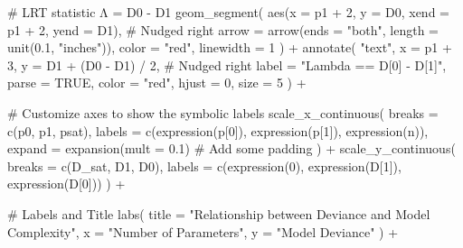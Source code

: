 \documentclass[
  letterpaper,
  DIV=11,
  numbers=noendperiod]{scrreprt}
\newenvironment{Shaded}{\begin{snugshade}}{\end{snugshade}}
\newcommand{\AttributeTok}[1]{\textcolor[rgb]{0.40,0.45,0.13}{#1}}
\newcommand{\CommentTok}[1]{\textcolor[rgb]{0.37,0.37,0.37}{#1}}
\newcommand{\ConstantTok}[1]{\textcolor[rgb]{0.56,0.35,0.01}{#1}}
\newcommand{\DecValTok}[1]{\textcolor[rgb]{0.68,0.00,0.00}{#1}}
\newcommand{\FloatTok}[1]{\textcolor[rgb]{0.68,0.00,0.00}{#1}}
\newcommand{\FunctionTok}[1]{\textcolor[rgb]{0.28,0.35,0.67}{#1}}
\newcommand{\NormalTok}[1]{\textcolor[rgb]{0.00,0.23,0.31}{#1}}
\newcommand{\SpecialCharTok}[1]{\textcolor[rgb]{0.37,0.37,0.37}{#1}}
\newcommand{\StringTok}[1]{\textcolor[rgb]{0.13,0.47,0.30}{#1}}
\begin{document}
\begin{Shaded}
\begin{Highlighting}[]
  \CommentTok{\# LRT statistic Λ = D0 {-} D1}
  \FunctionTok{geom\_segment}\NormalTok{(}
    \FunctionTok{aes}\NormalTok{(}\AttributeTok{x =}\NormalTok{ p1 }\SpecialCharTok{+} \DecValTok{2}\NormalTok{, }\AttributeTok{y =}\NormalTok{ D0, }\AttributeTok{xend =}\NormalTok{ p1 }\SpecialCharTok{+} \DecValTok{2}\NormalTok{, }\AttributeTok{yend =}\NormalTok{ D1), }\CommentTok{\# Nudged right}
    \AttributeTok{arrow =} \FunctionTok{arrow}\NormalTok{(}\AttributeTok{ends =} \StringTok{"both"}\NormalTok{, }\AttributeTok{length =} \FunctionTok{unit}\NormalTok{(}\FloatTok{0.1}\NormalTok{, }\StringTok{"inches"}\NormalTok{)),}
    \AttributeTok{color =} \StringTok{"red"}\NormalTok{,}
    \AttributeTok{linewidth =} \DecValTok{1}
\NormalTok{  ) }\SpecialCharTok{+}
  \FunctionTok{annotate}\NormalTok{(}
    \StringTok{"text"}\NormalTok{,}
    \AttributeTok{x =}\NormalTok{ p1 }\SpecialCharTok{+} \DecValTok{3}\NormalTok{, }\AttributeTok{y =}\NormalTok{ D1 }\SpecialCharTok{+}\NormalTok{ (D0 }\SpecialCharTok{{-}}\NormalTok{ D1) }\SpecialCharTok{/} \DecValTok{2}\NormalTok{, }\CommentTok{\# Nudged right}
    \AttributeTok{label =} \StringTok{"Lambda == D[0] {-} D[1]"}\NormalTok{,}
    \AttributeTok{parse =} \ConstantTok{TRUE}\NormalTok{,}
    \AttributeTok{color =} \StringTok{"red"}\NormalTok{, }\AttributeTok{hjust =} \DecValTok{0}\NormalTok{, }\AttributeTok{size =} \DecValTok{5}
\NormalTok{  ) }\SpecialCharTok{+}
  
  \CommentTok{\# Customize axes to show the symbolic labels}
  \FunctionTok{scale\_x\_continuous}\NormalTok{(}
    \AttributeTok{breaks =} \FunctionTok{c}\NormalTok{(p0, p1, psat),}
    \AttributeTok{labels =} \FunctionTok{c}\NormalTok{(}\FunctionTok{expression}\NormalTok{(p[}\DecValTok{0}\NormalTok{]), }\FunctionTok{expression}\NormalTok{(p[}\DecValTok{1}\NormalTok{]), }\FunctionTok{expression}\NormalTok{(n)),}
    \AttributeTok{expand =} \FunctionTok{expansion}\NormalTok{(}\AttributeTok{mult =} \FloatTok{0.1}\NormalTok{) }\CommentTok{\# Add some padding}
\NormalTok{  ) }\SpecialCharTok{+}
  \FunctionTok{scale\_y\_continuous}\NormalTok{(}
    \AttributeTok{breaks =} \FunctionTok{c}\NormalTok{(D\_sat, D1, D0),}
    \AttributeTok{labels =} \FunctionTok{c}\NormalTok{(}\FunctionTok{expression}\NormalTok{(}\DecValTok{0}\NormalTok{), }\FunctionTok{expression}\NormalTok{(D[}\DecValTok{1}\NormalTok{]), }\FunctionTok{expression}\NormalTok{(D[}\DecValTok{0}\NormalTok{]))}
\NormalTok{  ) }\SpecialCharTok{+}
  
  \CommentTok{\# Labels and Title}
  \FunctionTok{labs}\NormalTok{(}
    \AttributeTok{title =} \StringTok{"Relationship between Deviance and Model Complexity"}\NormalTok{,}
    \AttributeTok{x =} \StringTok{"Number of Parameters"}\NormalTok{,}
    \AttributeTok{y =} \StringTok{"Model Deviance"}
\NormalTok{  ) }\SpecialCharTok{+}
  

\end{Highlighting}
\end{Shaded}
\end{document}
